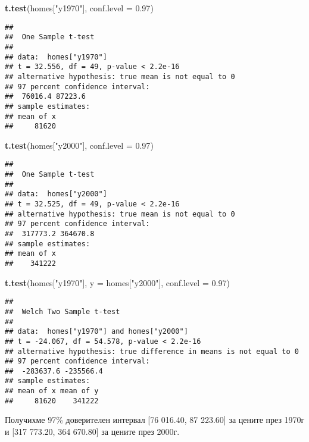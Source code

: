 \documentclass[]{article}
\newenvironment{Shaded}{\begin{snugshade}}{\end{snugshade}}
\newcommand{\KeywordTok}[1]{\textcolor[rgb]{0.13,0.29,0.53}{\textbf{#1}}}
\newcommand{\DataTypeTok}[1]{\textcolor[rgb]{0.13,0.29,0.53}{#1}}
\newcommand{\FloatTok}[1]{\textcolor[rgb]{0.00,0.00,0.81}{#1}}
\newcommand{\StringTok}[1]{\textcolor[rgb]{0.31,0.60,0.02}{#1}}
\newcommand{\NormalTok}[1]{#1}
\begin{document}
\begin{Shaded}
\begin{Highlighting}[]
\KeywordTok{t.test}\NormalTok{(homes[}\StringTok{"y1970"}\NormalTok{], }\DataTypeTok{conf.level =} \FloatTok{0.97}\NormalTok{)}
\end{Highlighting}
\end{Shaded}

\begin{verbatim}
## 
##  One Sample t-test
## 
## data:  homes["y1970"]
## t = 32.556, df = 49, p-value < 2.2e-16
## alternative hypothesis: true mean is not equal to 0
## 97 percent confidence interval:
##  76016.4 87223.6
## sample estimates:
## mean of x 
##     81620
\end{verbatim}

\begin{Shaded}
\begin{Highlighting}[]
\KeywordTok{t.test}\NormalTok{(homes[}\StringTok{"y2000"}\NormalTok{], }\DataTypeTok{conf.level =} \FloatTok{0.97}\NormalTok{)}
\end{Highlighting}
\end{Shaded}

\begin{verbatim}
## 
##  One Sample t-test
## 
## data:  homes["y2000"]
## t = 32.525, df = 49, p-value < 2.2e-16
## alternative hypothesis: true mean is not equal to 0
## 97 percent confidence interval:
##  317773.2 364670.8
## sample estimates:
## mean of x 
##    341222
\end{verbatim}

\begin{Shaded}
\begin{Highlighting}[]
\KeywordTok{t.test}\NormalTok{(homes[}\StringTok{"y1970"}\NormalTok{], }\DataTypeTok{y =}\NormalTok{ homes[}\StringTok{"y2000"}\NormalTok{], }\DataTypeTok{conf.level =} \FloatTok{0.97}\NormalTok{)}
\end{Highlighting}
\end{Shaded}

\begin{verbatim}
## 
##  Welch Two Sample t-test
## 
## data:  homes["y1970"] and homes["y2000"]
## t = -24.067, df = 54.578, p-value < 2.2e-16
## alternative hypothesis: true difference in means is not equal to 0
## 97 percent confidence interval:
##  -283637.6 -235566.4
## sample estimates:
## mean of x mean of y 
##     81620    341222
\end{verbatim}

Получихме 97\% доверителен интервал {[}76 016.40, 87 223.60{]} за цените
през 1970г и {[}317 773.20, 364 670.80{]} за цените през 2000г.
\end{document}
